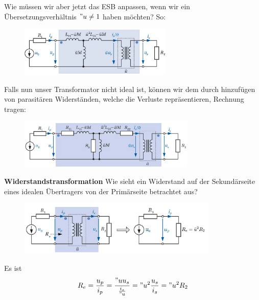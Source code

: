 Wie müssen wir aber jetzt das ESB anpassen, wenn wir ein Übersetzungsverhältnis $"u \neq 1$ haben möchten? So:
\begin{figure}[H]
\center
\includegraphics[width=0.65\textwidth]{img/Tra8}
\vspace{-0.2cm}
\end{figure}
Falls nun unser Transformator nicht ideal ist, können wir dem durch hinzufügen von parasitären Widerständen, welche die Verluste repräsentieren, Rechnung tragen:
\begin{figure}[H]
\center
\includegraphics[width=0.75\textwidth]{img/Tra9}
\vspace{-0.2cm}
\end{figure}

\textbf{Widerstandstransformation}\newline
Wie sieht ein Widerstand auf der Sekundärseite eines idealen Übertragers von der Primärseite betrachtet aus?
\begin{figure}[H]
\center
\includegraphics[width=0.85\textwidth]{img/Tra10}
\vspace{-0.2cm}
\end{figure}
Es ist
$$R_e = \frac{u_p}{i_p} = \frac{"u u_s}{\frac{i_s}{"u}}="u^2\frac{u_s}{i_s} = "u^2R_2$$
\pagebreak
